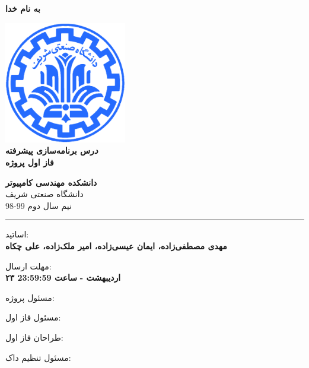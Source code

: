 \documentclass[]{article}
\begin{document}
\begin{titlepage}
\begin{center}

\textbf{ \Huge{به نام خدا} }
        
\vspace{0.2cm}

\includegraphics[width=0.4\textwidth]{sharif1.png}\\
\vspace{0.2cm}
\textbf{ \Huge{\emph درس برنامه‌سازی پیشرفته} }\\
\vspace{0.25cm}
\textbf{ \Large{ فاز اول پروژه} }
\vspace{0.2cm}
       
 
      \large \textbf{دانشکده مهندسی کامپیوتر}\\\vspace{0.1cm}
    \large   دانشگاه صنعتی شریف\\\vspace{0.2cm}
       \large   ﻧﯿﻢ سال دوم 99-98 \\\vspace{0.10cm}
      \noindent\rule[1ex]{\linewidth}{1pt}
اساتید:\\
    \textbf{{مهدی مصطفی‌زاده، ایمان عیسی‌زاده، امیر ملک‌زاده، علی چکاه}}



    \vspace{0.20cm}

   مهلت ارسال:\\
    \textbf{{۲۳ اردیبهشت - }}
    \textbf{{ساعت 23:59:59}}

    \vspace{0.10cm}
مسئول پروژه:\\
    \textbf{}
    
        \vspace{0.10cm}
مسئول فاز اول:\\
    \textbf{}
    
        \vspace{0.10cm}
طراحان فاز اول:\\
    \textbf{}
    
        \vspace{0.05cm}
مسئول تنظیم داک:\\
    \textbf{}
    

\end{center}
\end{titlepage}
\end{document}
